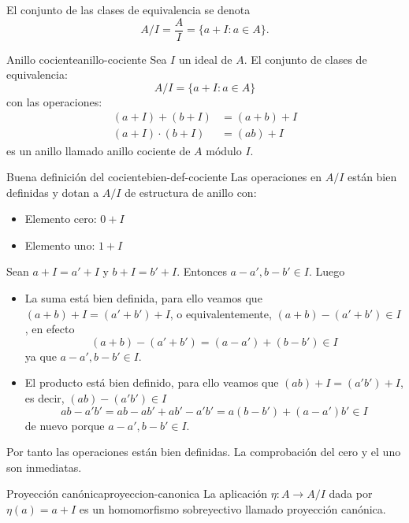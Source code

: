 El conjunto de las clases de equivalencia se denota
\[
A/I = \frac{A}{I} = \{a + I : a \in A\}.
\]

\begin{definition}{Anillo cociente}{anillo-cociente}
    Sea \(I\) un ideal de \(A\). El conjunto de clases de equivalencia:
    \[
    A/I = \{a + I : a \in A\}
    \]
    con las operaciones:
    \begin{align*}
        (a + I) + (b + I) &= (a + b) + I \\
        (a + I) \cdot (b + I) &= (ab) + I
    \end{align*}
    es un anillo llamado {anillo cociente de \(A\) módulo \(I\)}.
\end{definition}

\begin{proposition}{Buena definición del cociente}{bien-def-cociente}
    Las operaciones en \(A/I\) están bien definidas y dotan a \(A/I\) de estructura de anillo con:
    \begin{itemize}
        \item Elemento cero: \(0 + I\)
        \item Elemento uno: \(1 + I\)
    \end{itemize}
\end{proposition}

\begin{proofbox}
    Sean \(a + I = a' + I\) y \(b + I = b' + I\). Entonces \(a - a', b - b' \in I\). Luego
    \begin{itemize}
        \item La suma está bien definida, para ello veamos que $(a+b) + I = (a' + b') + I$, o equivalentemente, $(a + b) - (a' + b') \in I$, en efecto
        \[
        (a + b) - (a' + b') = (a - a') + (b - b') \in I
        \]
        ya que $a - a', b - b' \in I$.
        \item El producto está bien definido, para ello veamos que $(ab) + I = (a'b') + I$, es decir, $(ab) - (a'b') \in I$
        \[
        ab - a'b' = ab - ab' + ab' - a'b' = a(b - b') + (a - a')b' \in I
        \]
        de nuevo porque $a - a', b - b' \in I$.
    \end{itemize}
    Por tanto las operaciones están bien definidas. La comprobación del cero y el uno son inmediatas.
\end{proofbox}

\begin{definition}{Proyección canónica}{proyeccion-canonica}
    La aplicación \(\eta: A \to A/I\) dada por \(\eta(a) = a + I\) es un homomorfismo sobreyectivo llamado {proyección canónica}.
\end{definition}


